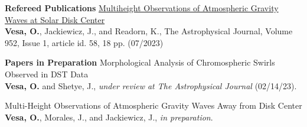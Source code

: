 \documentclass{resume} %
\begin{document}

\vspace{-0.1in}
\begin{rSection}{\textbf{Refereed Publications}}
\vspace{0.02in}
\href{https://iopscience.iop.org/article/10.3847/1538-4357/acd930}{Multiheight Observations of Atmospheric Gravity Waves at Solar Disk Center} \\ {\bf Vesa, O.}, Jackiewicz, J., and Readorn, K., The Astrophysical Journal, Volume 952, Issue 1, article id. 58, 18 pp. (07/2023)
\end{rSection} 


\vspace{-0.1in}
\begin{rSection}{\textbf{Papers in Preparation}}
\vspace{0.02in}
Morphological Analysis of Chromospheric Swirls Observed in DST Data \\
{\bf Vesa, O.} and Shetye, J., {\it under review at The Astrophysical Journal} (02/14/23).

Multi-Height Observations of Atmospheric Gravity Waves Away from Disk Center \\
{\bf Vesa, O.}, Morales, J., and Jackiewicz, J., {\it in preparation}.
\end{rSection} 
\end{document}
